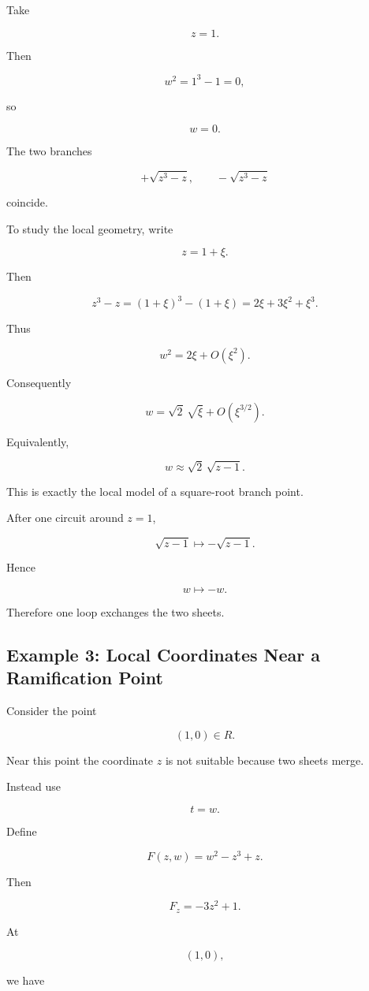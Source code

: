 \documentclass[12pt,a4paper]{article}
\theoremstyle{notespace}
\begin{document}
Take

\[
z=1.
\]

Then

\[
w^2=1^3-1=0,
\]

so

\[
w=0.
\]

The two branches

\[
+\sqrt{z^3-z},
\qquad
-\sqrt{z^3-z}
\]

coincide.

To study the local geometry, write

\[
z=1+\xi.
\]

Then

\[
z^3-z
=
(1+\xi)^3-(1+\xi)
=
2\xi+3\xi^2+\xi^3.
\]

Thus

\[
w^2
=
2\xi+O(\xi^2).
\]

Consequently

\[
w
=
\sqrt2\,\sqrt{\xi}
+O(\xi^{3/2}).
\]

Equivalently,

\[
w
\approx
\sqrt2\,\sqrt{z-1}.
\]

This is exactly the local model of a square-root branch point.

After one circuit around \(z=1\),

\[
\sqrt{z-1}
\longmapsto
-\sqrt{z-1}.
\]

Hence

\[
w
\longmapsto
-w.
\]

Therefore one loop exchanges the two sheets.

\bigskip

\subsection{Example 3: Local Coordinates Near a Ramification Point}

Consider the point

\[
(1,0)\in R.
\]

Near this point the coordinate \(z\) is not suitable because two sheets merge.

Instead use

\[
t=w.
\]

Define

\[
F(z,w)
=
w^2-z^3+z.
\]

Then

\[
F_z
=
-3z^2+1.
\]

At

\[
(1,0),
\]

we have
\end{document}
